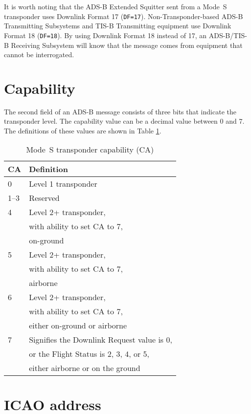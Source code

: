 It is worth noting that the ADS-B Extended Squitter sent from a Mode~S transponder uses Downlink Format 17 (\texttt{DF=17}). Non-Transponder-based ADS-B Transmitting Subsystems and TIS-B Transmitting equipment use Downlink Format 18 (\texttt{DF=18}). By using Downlink Format 18 instead of 17, an ADS-B/TIS-B Receiving Subsystem will know that the message comes from equipment that cannot be interrogated.

\section{Capability}

The second field of an ADS-B message consists of three bits that indicate the transponder level. The capability value can be a decimal value between 0 and 7. The definitions of these values are shown in Table \ref{tb:transponder_capability}.

\begin{table}[!ht]
\centering
\caption{Mode~S transponder capability (CA)}
\label{tb:transponder_capability}
\begin{tabular}{|l|p{8cm}|}
\hline
\textbf{CA} & \textbf{Definition} \\ \hline
0 & Level 1 transponder \\ \hline
1--3 & Reserved \\ \hline
4 & Level 2+ transponder, \\
& with ability to set CA to 7, \\ 
& on-ground \\ \hline
5 & Level 2+ transponder, \\
& with ability to set CA to 7, \\
& airborne \\ \hline
6 & Level 2+ transponder, \\ 
& with ability to set CA to 7, \\ 
& either on-ground or airborne \\ \hline
7 & Signifies the Downlink Request value is 0, \\
& or the Flight Status is 2, 3, 4, or 5, \\
& either airborne or on the ground \\ \hline
\end{tabular}
\end{table}

\section{ICAO address}

